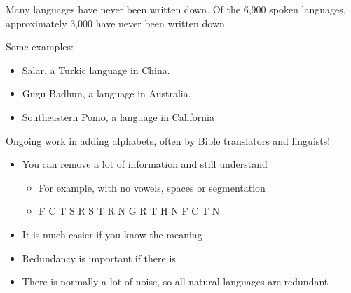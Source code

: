 \documentclass[a4paper,landscape,headrule,footrule,xetex]{foils}
\begin{document}




Many languages have never been written down. Of the 6,900 spoken
languages, approximately 3,000 have never been written down.

Some examples:
\begin{itemize}
\item Salar, a Turkic language in China.
\item Gugu Badhun, a language in Australia.
\item Southeastern Pomo, a language in California
\end{itemize}

Ongoing work in adding alphabets, often by Bible translators and linguists!




\begin{itemize}
\item You can remove a lot of information and still understand
  \begin{itemize}
  \item For example, with no vowels, spaces or segmentation
  \item  F C T S R S T R N G R T H N F C T N
    \\ 
  \end{itemize}
\item It is much easier if you know the meaning
\item Redundancy is important if there is 
\item There is normally a lot of noise, so all natural languages are redundant
\end{itemize}



\end{document}
